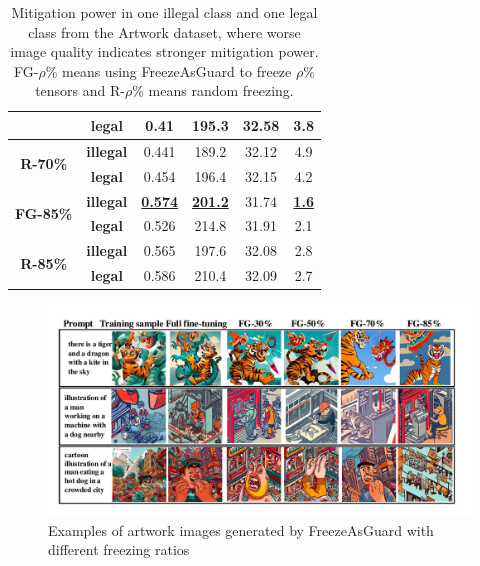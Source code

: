 \documentclass{article}
\begin{document}
\begin{table}[ht]
{\begin{tabular}{cccccc}
			&\textbf{legal}&0.41&195.3&32.58&3.8  \\  \midrule[1pt]
			\multirow{2}{*}{\textbf{R-70\%}}
			&\textbf{illegal}&0.441&189.2 &32.12&4.9 \\ \cmidrule(ll){2-6}
			&\textbf{legal}&0.454& 196.4 &32.15&4.2 \\  \midrule[1pt]
			\multirow{2}{*}{\textbf{FG-85\%}}
			&\textbf{illegal}&\textbf{\underline{0.574}}& \textbf{\underline{201.2}}&31.74&\textbf{\underline{1.6}}\\ \cmidrule(ll){2-6}
			&\textbf{legal}&0.526& 214.8 &31.91&2.1\\  \midrule[1pt]
			\multirow{2}{*}{\textbf{R-85\%}}
			&\textbf{illegal}&0.565 & 197.6&32.08&2.8\\ \cmidrule(ll){2-6}
			&\textbf{legal}&0.586 & 210.4&32.09&2.7\\ \bottomrule
	\end{tabular}}
	\vspace{0.1in}
	\caption{Mitigation power in one illegal class and one legal class from the Artwork dataset, where worse image quality indicates stronger mitigation power. FG-$\rho$\% means using FreezeAsGuard to freeze $\rho$\% tensors and R-$\rho$\% means random freezing.}
	\vspace{-0.1in}
	\label{tab:main_results}
\end{table}

\begin{figure}[ht]
	\centering
	\vspace{-0.15in}
	\includegraphics[width=0.9\linewidth]{figures/art_ratios_3rows.pdf}
	\vspace{-0.1in}
	\caption{Examples of artwork images generated by FreezeAsGuard with different freezing ratios}
	\label{fig:art_ratio}
	\vspace{-0.2in}
\end{figure}
\end{document}
